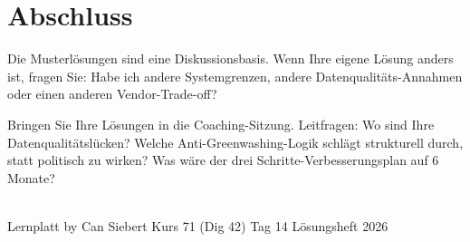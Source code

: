\documentclass[11pt,a4paper,oneside]{article}
\begin{document}
\clearpage

\section*{Abschluss}
\thispagestyle{plain}

\noindent Die Musterl\"osungen sind eine Diskussionsbasis. Wenn Ihre eigene L\"osung anders ist, fragen Sie: Habe ich andere Systemgrenzen, andere Datenqualit\"ats-Annahmen oder einen anderen Vendor-Trade-off?

\medskip
\begin{infobox}
Bringen Sie Ihre L\"osungen in die Coaching-Sitzung. Leitfragen: Wo sind Ihre Datenqualit\"atsl\"ucken? Welche Anti-Greenwashing-Logik schl\"agt strukturell durch, statt politisch zu wirken? Was w\"are der drei Schritte-Verbesserungsplan auf 6 Monate?
\end{infobox}

\vspace{1cm}
\noindent{\color{lpAccent}\rule{\linewidth}{0.6pt}}\\[4pt]
{\footnotesize\sffamily\color{lpGray}Lernplatt \textperiodcentered{} by Can Siebert \textperiodcentered{} Kurs 71 (Dig 42) \textperiodcentered{} Tag 14 \textperiodcentered{} L\"osungsheft \textperiodcentered{} \textcopyright{} 2026}
\end{document}

